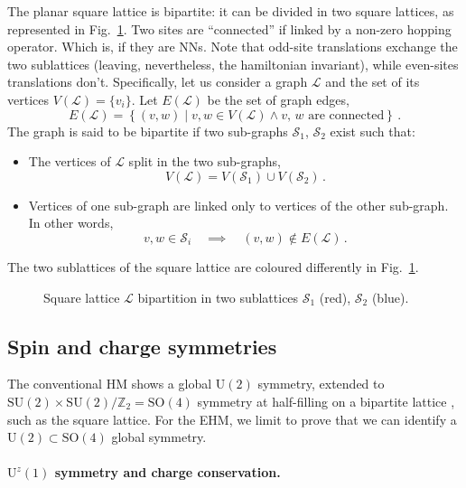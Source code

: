 The planar square lattice is bipartite: it can be divided in two square lattices, as represented in Fig.~\ref{fig:square-sublattices}. Two sites are ``connected'' if linked by a non-zero hopping operator. Which is, if they are NNs. Note that odd-site translations exchange the two sublattices (leaving, nevertheless, the hamiltonian invariant), while even-sites translations don't. Specifically, let us consider a graph $\mathcal{L}$ and the set of its vertices $V(\mathcal{L}) = \lbrace v_i \rbrace$. Let $E(\mathcal{L})$ be the set of graph edges,
\[
	E(\mathcal{L}) = \left\lbrace (v,w) \mid v,w \in V(\mathcal{L}) \land \text{$v$, $w$ are connected} \right\rbrace \, .
\]
The graph is said to be bipartite if two sub-graphs $\mathcal{S}_1$, $\mathcal{S}_2$ exist such that:
\begin{itemize}
	\item The vertices of $\mathcal{L}$ split in the two sub-graphs,
	\[
		V(\mathcal{L}) = V(\mathcal{S}_1) \cup V(\mathcal{S}_2) \, .
	\]
	\item Vertices of one sub-graph are linked only to vertices of the other sub-graph. In other words,
	\[
		v,w \in \mathcal{S}_i
		\quad\implies\quad
		(v,w) \notin E(\mathcal{L}) \, .
	\]
\end{itemize}
The two sublattices of the square lattice are coloured differently in Fig.~\ref{fig:square-sublattices}.

\begin{figure}
	\centering
	
	\caption{Square lattice $\mathcal{L}$ bipartition in two sublattices $\mathcal{S}_1$ (red), $\mathcal{S}_2$ (blue).}
	\label{fig:square-sublattices}
\end{figure}

\subsection{Spin and charge symmetries}\label{subsec:spin-charge-syms}

The conventional HM shows a global $\mathrm{U}(2)$ symmetry, extended to $\mathrm{SU}(2) \times \mathrm{SU}(2) / \mathbb{Z}_2 = \mathrm{SO}(4)$ symmetry at half-filling on a bipartite lattice \cite{arovas2022hubbard}, such as the square lattice. For the EHM, we limit to prove that we can identify a $\mathrm{U}(2) \subset \mathrm{SO}(4)$ global symmetry.

\paragraph{$\mathrm{U}^z(1)$ symmetry and charge conservation.} 

